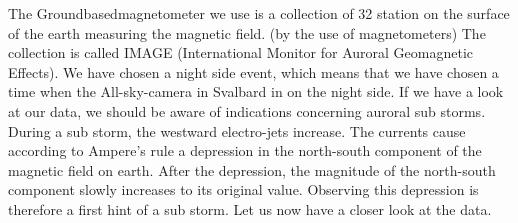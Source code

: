 \documentclass[10pt,a4paper]{article}
\begin{document}
The Groundbasedmagnetometer we use is a collection of 32 station on the surface of the earth measuring the magnetic field. (by the use of magnetometers) 
The collection is called IMAGE (International Monitor for Auroral Geomagnetic Effects). We have chosen a night side event, which means that we have chosen a time when the All-sky-camera in Svalbard in on the night side. 
If we have a look at our data, we should be aware of indications concerning auroral sub storms. During a sub storm, the westward electro-jets increase. The currents cause according to Ampere's rule a depression in the north-south component of the magnetic field on earth. After the depression, the magnitude of the north-south component slowly increases to its original value.
Observing this depression is therefore a first hint of a sub storm. 
Let us now have a closer look at the data. 
\end{document}
